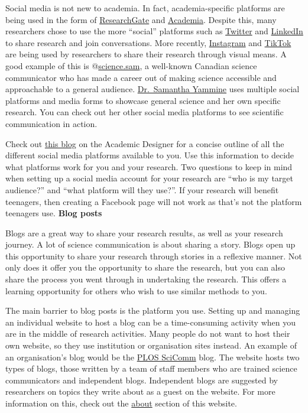 \documentclass[
]{book}
\begin{document}
Social media is not new to academia. In fact, academia-specific platforms are being used in the form of \href{https://www.researchgate.net/}{ResearchGate} and \href{https://www.academia.edu/}{Academia}. Despite this, many researchers chose to use the more ``social'' platforms such as \href{http://www.twitter.com/}{Twitter} and \href{http://www.linkedin.com/}{LinkedIn} to share research and join conversations. More recently, \href{http://www.instagram.com/}{Instagram} and \href{https://www.tiktok.com/en}{TikTok} are being used by researchers to share their research through visual means. A good example of this is @\href{https://www.instagram.com/science.sam/}{science.sam}, a well-known Canadian science communicator who has made a career out of making science accessible and approachable to a general audience. \href{https://www.samanthayammine.com/}{Dr.~Samantha Yammine} uses multiple social platforms and media forms to showcase general science and her own specific research. You can check out her other social media platforms to see scientific communication in action.

Check out \href{https://theacademicdesigner.com/2019/social-media-platforms/}{this blog} on the Academic Designer for a concise outline of all the different social media platforms available to you. Use this information to decide what platforms work for you and your research. Two questions to keep in mind when setting up a social media account for your research are ``who is my target audience?'' and ``what platform will they use?''. If your research will benefit teenagers, then creating a Facebook page will not work as that's not the platform teenagers use. \textbf{Blog posts}

Blogs are a great way to share your research results, as well as your research journey. A lot of science communication is about sharing a story. Blogs open up this opportunity to share your research through stories in a reflexive manner. Not only does it offer you the opportunity to share the research, but you can also share the process you went through in undertaking the research. This offers a learning opportunity for others who wish to use similar methods to you.

The main barrier to blog posts is the platform you use. Setting up and managing an individual website to host a blog can be a time-consuming activity when you are in the middle of research activities. Many people do not want to host their own website, so they use institution or organisation sites instead. An example of an organisation's blog would be the \href{https://scicomm.plos.org/}{PLOS SciComm} blog. The website hosts two types of blogs, those written by a team of staff members who are trained science communicators and independent blogs. Independent blogs are suggested by researchers on topics they write about as a guest on the website. For more information on this, check out the \href{https://plos.org/blogs/about/}{about} section of this website.
\end{document}
